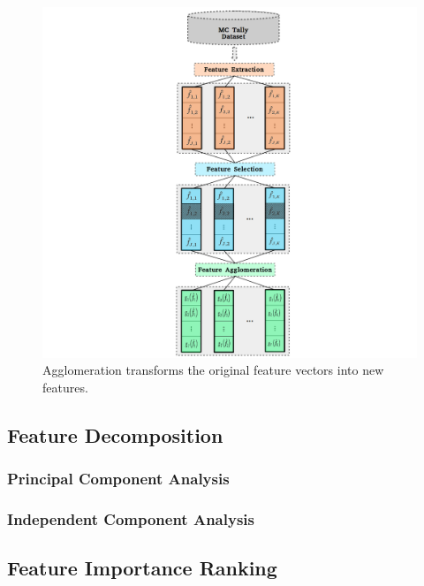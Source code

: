 \begin{figure}[h!]
\centering
\includegraphics[width=0.95\linewidth]{figures/unsupervised/features/engineering/agglomerate}
\vspace{2mm}
\caption[\textit{i}MGXS feature agglomeration]{Agglomeration transforms the original feature vectors into new features.}
\label{fig:chap10-agglomerate}
\end{figure}

\subsection{Feature Decomposition}
\label{subsec:chap10-feature-decomp}

\subsubsection{Principal Component Analysis}
\label{subsubsec:chap10-feature-pca}

\subsubsection{Independent Component Analysis}
\label{subsubsec:chap10-feature-transform-ica}

\subsection{Feature Importance Ranking}
\label{subsec:chap10-feature-importance}

